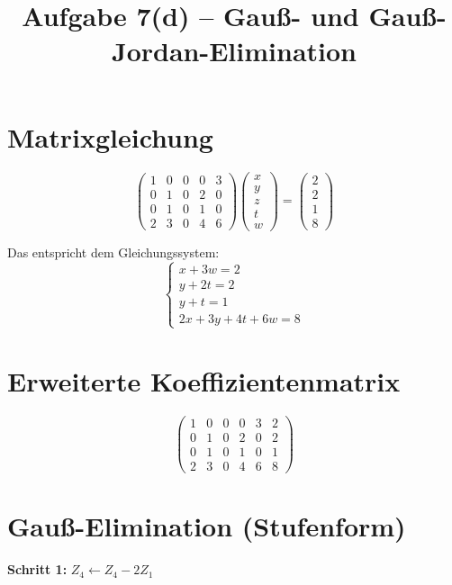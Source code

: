 \documentclass[a4paper,12pt]{article}
\title{Aufgabe 7(d) -- Gauß- und Gauß-Jordan-Elimination}
\author{}
\date{}
\begin{document}
\maketitle

\section*{Matrixgleichung}

\[
\begin{pmatrix} 1 & 0 & 0 & 0 & 3 \\ 0 & 1 & 0 & 2 & 0 \\ 0 & 1 & 0 & 1 & 0 \\ 2 & 3 & 0 & 4 & 6 \end{pmatrix}
\begin{pmatrix} x \\ y \\ z \\ t \\ w \end{pmatrix}
=
\begin{pmatrix} 2 \\ 2 \\ 1 \\ 8 \end{pmatrix}
\]

Das entspricht dem Gleichungssystem:
\[
\begin{cases}
x + 3w = 2 \\
y + 2t = 2 \\
y + t = 1 \\
2x + 3y + 4t + 6w = 8
\end{cases}
\]

\section*{Erweiterte Koeffizientenmatrix}

\[
\left(\begin{array}{ccccc|c}
1 & 0 & 0 & 0 & 3 & 2 \\
0 & 1 & 0 & 2 & 0 & 2 \\
0 & 1 & 0 & 1 & 0 & 1 \\
2 & 3 & 0 & 4 & 6 & 8
\end{array}\right)
\]

\section*{Gauß-Elimination (Stufenform)}

\textbf{Schritt 1:} $Z_4 \leftarrow Z_4 - 2Z_1$
\end{document}
